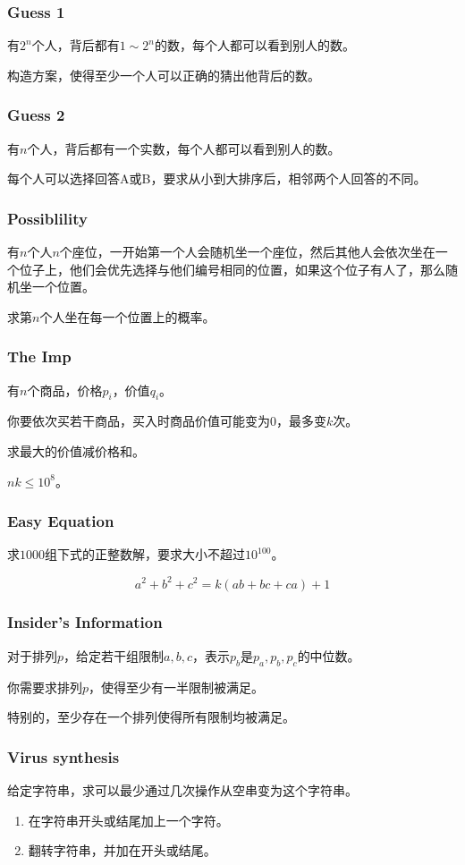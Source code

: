 \documentclass[10pt]{beamer}
\begin{document}
	\begin{frame}
		\frametitle{Guess 1}
	
		有$2^n$个人，背后都有$1\sim 2^n$的数，每个人都可以看到别人的数。

		构造方案，使得至少一个人可以正确的猜出他背后的数。
	
	\end{frame}
	\begin{frame}
		\frametitle{Guess 2}
	
		有$n$个人，背后都有一个实数，每个人都可以看到别人的数。
		
		每个人可以选择回答A或B，要求从小到大排序后，相邻两个人回答的不同。
	
	\end{frame}
	\begin{frame}
		\frametitle{Possiblility}
	
		有$n$个人$n$个座位，一开始第一个人会随机坐一个座位，然后其他人会依次坐在一个位子上，他们会优先选择与他们编号相同的位置，如果这个位子有人了，那么随机坐一个位置。

		求第$n$个人坐在每一个位置上的概率。
	
	\end{frame}
	\begin{frame}
		\frametitle{The Imp}
	
		有$n$个商品，价格$p_i$，价值$q_i$。

		你要依次买若干商品，买入时商品价值可能变为$0$，最多变$k$次。

		求最大的价值减价格和。

		$nk\le 10^8$。
	
	\end{frame}
	\begin{frame}
		\frametitle{Easy Equation}
	
		求$1000$组下式的正整数解，要求大小不超过$10^{100}$。
	
		$$
		a^2+b^2+c^2=k(ab+bc+ca)+1
		$$

	\end{frame}
	\begin{frame}
		\frametitle{Insider’s Information}
	
		对于排列$p$，给定若干组限制$a,b,c$，表示$p_b$是$p_a,p_b,p_c$的中位数。
		
		你需要求排列$p$，使得至少有一半限制被满足。

		特别的，至少存在一个排列使得所有限制均被满足。
	\end{frame}
	\begin{frame}
		\frametitle{Virus synthesis}
	
		给定字符串，求可以最少通过几次操作从空串变为这个字符串。
	
		\begin{enumerate}
			\item 在字符串开头或结尾加上一个字符。
			\item 翻转字符串，并加在开头或结尾。
		\end{enumerate}

	\end{frame}
\end{document}
